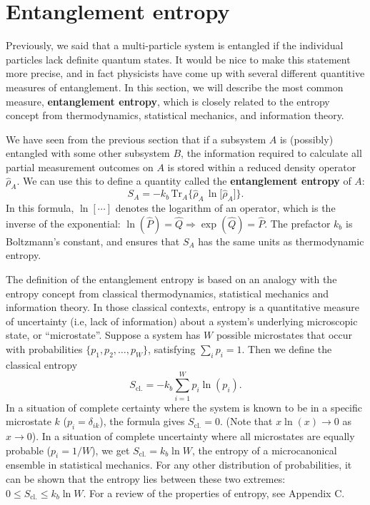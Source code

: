 \documentclass[pra,12pt]{revtex4}
\begin{document}
\section{Entanglement entropy}
\label{sec:entropy}

Previously, we said that a multi-particle system is entangled if the
individual particles lack definite quantum states.  It would be nice
to make this statement more precise, and in fact physicists have come
up with several different quantitive measures of entanglement.  In
this section, we will describe the most common measure,
\textbf{entanglement entropy}, which is closely related to the entropy
concept from thermodynamics, statistical mechanics, and information
theory.

We have seen from the previous section that if a subsystem $A$ is
(possibly) entangled with some other subsystem $B$, the information
required to calculate all partial measurement outcomes on $A$ is
stored within a reduced density operator $\hat{\rho}_A$.  We can use
this to define a quantity called the \textbf{entanglement entropy} of
$A$:
\begin{equation}
  S_{A} = - k_b \, \mathrm{Tr}_A \Big\{ \hat{\rho}_A\, \ln\!\big[\hat{\rho}_A\big]\Big\}.
  \label{entropy}
\end{equation}
In this formula, $\ln[\cdots]$ denotes the logarithm of an operator,
which is the inverse of the exponential: $\ln(\hat{P}) = \hat{Q}
\Rightarrow \exp(\hat{Q}) = \hat{P}$.  The prefactor $k_b$ is
Boltzmann's constant, and ensures that $S_A$ has the same units as
thermodynamic entropy.

The definition of the entanglement entropy is based on an analogy with
the entropy concept from classical thermodynamics, statistical
mechanics and information theory.  In those classical contexts,
entropy is a quantitative measure of uncertainty (i.e, lack of
information) about a system's underlying microscopic state, or
``microstate''.  Suppose a system has $W$ possible microstates that
occur with probabilities $\{p_1, p_2, \dots, p_W\}$, satisfying
$\sum_i p_i = 1$.  Then we define the classical entropy
\begin{equation}
  S_{\mathrm{cl.}} = - k_b \sum_{i=1}^W p_i \ln(p_i).
\end{equation}
In a situation of complete certainty where the system is known to be
in a specific microstate $k$ ($p_i = \delta_{ik}$), the formula gives
$S_{\mathrm{cl.}} = 0$.  (Note that $x \ln(x)\rightarrow 0$ as
$x\rightarrow 0$).  In a situation of complete uncertainty where all
microstates are equally probable ($p_i = 1/W$), we get
$S_{\mathrm{cl.}} = k_b \ln W$, the entropy of a microcanonical
ensemble in statistical mechanics.  For any other distribution of
probabilities, it can be shown that the entropy lies between these two
extremes: $0 \le S_{\mathrm{cl.}}  \le k_b\ln W$.  For a review of the
properties of entropy, see Appendix C.
\end{document}
